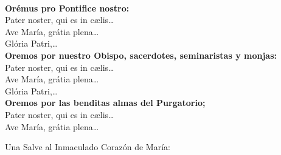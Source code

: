 \documentclass[10pt,oneside]{book}
\begin{document}
\begin{paracol}{2}
      \\[1mm]
      \textbf{Orémus pro Pontifice nostro:}\\
      \hspace*{5mm}Pater noster, qui es in c{\ae}lis\ldots\\
      \hspace*{5mm}Ave María, grátia plena\ldots\\
      \hspace*{5mm}Glória Patri,\ldots\\[2mm]
      \textbf{Oremos por nuestro Obispo, sacerdotes, seminaristas y monjas:}\\
      \hspace*{5mm}Pater noster, qui es in c{\ae}lis\ldots\\
      \hspace*{5mm}Ave María, grátia plena\ldots\\
      \hspace*{5mm}Glória Patri,\ldots\\[2mm]
      \textbf{Oremos por las benditas almas del Purgatorio;}\\
      \hspace*{5mm}Pater noster, qui es in c{\ae}lis\ldots\\
      \hspace*{5mm}Ave María, grátia plena\ldots\\
      \hspace*{2.5mm}
\end{paracol}

\vspace{3mm}
Una Salve al Inmaculado Corazón de María:
\begin{paracol}{2}  
      
      \switchcolumn
                                                                             
\end{paracol}

\vspace{3mm}
\end{document}
